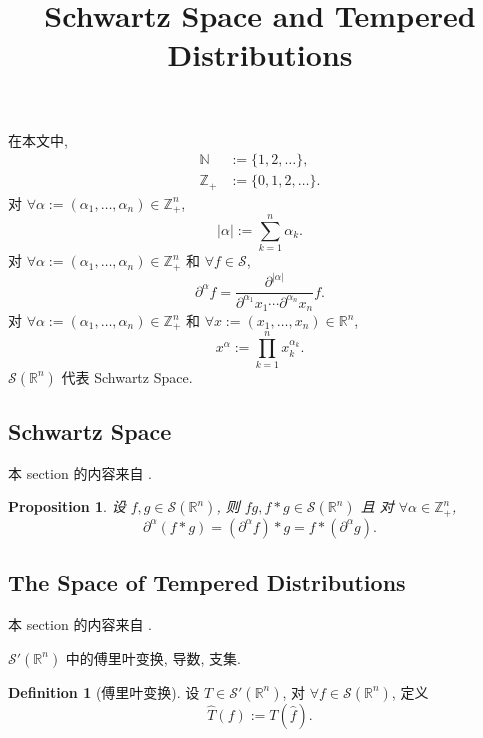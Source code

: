 \documentclass[a4paper,11pt]{article}
\title{Schwartz Space and Tempered Distributions}
\newtheorem{proposition}[theorem]{Proposition}
\theoremstyle{definition}
\newtheorem{definition}[theorem]{Definition}
\begin{document}
\begin{CJK*}{UTF8}{gbsn}

\maketitle

在本文中, 
\begin{align*}
    \mathbb{N} &:= \{1, 2, \ldots\}, \\
    \mathbb{Z}_+ &:= \{0, 1, 2, \ldots\}.
\end{align*}
对 $ \forall \alpha := (\alpha_1, \ldots, \alpha_n) \in \mathbb{Z}_+^n $,
$$
    |\alpha| := \sum_{k = 1}^n \alpha_k.
$$
对 $ \forall \alpha := (\alpha_1, \ldots, \alpha_n) \in \mathbb{Z}_+^n $ 
和 $ \forall f \in \mathcal{S} $,
$$
    \partial^\alpha f = \frac{\partial^{|\alpha|}}{\partial^{\alpha_1} x_1 \cdots \partial^{\alpha_n} x_n} f.
$$
对 $ \forall \alpha := (\alpha_1, \ldots, \alpha_n) \in \mathbb{Z}_+^n $ 
和 $ \forall x := (x_1, \ldots, x_n) \in \mathbb{R}^n $,
$$
    x^\alpha := \prod_{k = 1}^n x_k^{\alpha_k}.
$$ 
$ \mathcal{S}(\mathbb{R}^n) $ 代表 Schwartz Space.

\subsection{Schwartz Space}

本 section 的内容来自 \cite[2.2]{g14c}.

\begin{proposition}
    设 $ f, g \in \mathcal{S}(\mathbb{R}^n) $, 则 $ f g, f * g \in \mathcal{S}(\mathbb{R}^n) $ 且
    对 $ \forall \alpha \in \mathbb{Z}_+^n $,
    $$
        \partial^\alpha (f * g) =  (\partial^\alpha f) * g = f * (\partial^\alpha g).
    $$
\end{proposition}

\subsection{The Space of Tempered Distributions}

本 section 的内容来自 \cite[2.3]{g14c}.

$ \mathcal{S}'(\mathbb{R}^n) $ 中的傅里叶变换, 导数, 支集.

\begin{definition}[傅里叶变换]
    设 $ T \in \mathcal{S}'(\mathbb{R}^n) $, 对 $ \forall f \in \mathcal{S}(\mathbb{R}^n) $, 定义
    $$
        \widehat{T}(f) := T(\hat{f}).
    $$
\end{definition}


\end{CJK*}
\end{document}
